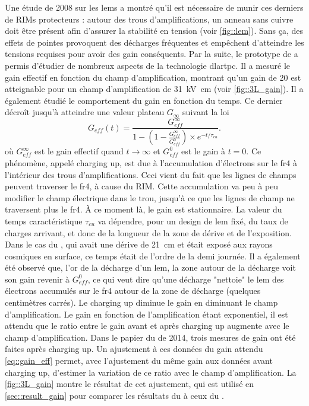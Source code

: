       Une étude de 2008 sur les \glspl{lem}\cite{Breskin2008} a montré qu'il est nécessaire de munir ces derniers de RIMs protecteurs : autour des trous d'amplifications, un anneau sans cuivre doit être présent afin d'assurer la stabilité en tension (voir \autoref{fig::lem}). Sans ça, des effets de pointes provoquent des décharges fréquentes et empêchent d'atteindre les tensions requises pour avoir des gain conséquents. Par la suite, le prototype de \threeL{}\cite{Cantini2013,Cantini2014} a permis d'étudier de nombreux aspects de la technologie \gls{dlartpc}. Il a mesuré le gain effectif en fonction du champ d'amplification, montrant qu'un gain de 20 est atteignable pour un champ d'amplification de \SI{31}{\kilo\volt\centi\meter} (voir \autoref{fig::3L_gain}). Il a également étudié le comportement du gain en fonction du temps. Ce dernier décroît jusqu'à atteindre une valeur plateau $G_{\infty}$ suivant la loi
      \begin{equation}
        G_{eff}(t) = \frac{G_{eff}^{\infty}}{1-\left(1-\frac{G_{eff}^{\infty}}{G_{eff}^0}\right)\times e^{-t/\tau_{cu}}}.
      \end{equation}
      où $G_{eff}^{\infty}$ est le gain effectif quand $t\to\infty$ et $G_{eff}^0$ est le gain à $t=0$. Ce phénomène, appelé charging up, est due à l'accumulation d'électrons sur le \gls{fr4} à l'intérieur des trous d'amplifications. Ceci vient du fait que les lignes de champs peuvent traverser le \gls{fr4}, à cause du RIM. Cette accumulation va peu à peu modifier le champ électrique dans le trou, jusqu'à ce que les lignes de champ ne traversent plus le \gls{fr4}. À ce moment là, le gain est stationnaire. La valeur du temps caractéristique $\tau_{cu}$ va dépendre, pour un design de \gls{lem} fixé, du taux de charges arrivant, et donc de la longueur de la zone de dérive et de l'exposition. Dans le cas du \threeL{}, qui avait une dérive de \SI{21}{\centi\meter} et était exposé aux rayons cosmiques en surface, ce temps était de l'ordre de la demi journée. Il a également été observé que, l'or de la décharge d'un \gls{lem}, la zone autour de la décharge voit son gain revenir à $G_{eff}^0$, ce qui veut dire qu'une décharge "nettoie" le \gls{lem} des électrons accumulés sur le \gls{fr4} autour de la zone de décharge (quelques centimètres carrés).  Le charging up diminue le gain en diminuant le champ d'amplification. Le gain en fonction de l'amplification étant exponentiel, il est attendu que le ratio entre le gain avant et après charging up augmente avec le champ d'amplification. Dans le papier du \threeL{} de 2014, trois mesures de gain ont été faites après charging up. Un ajustement à ces données du gain attendu \eqref{eq::gain_eff} permet, avec l'ajustement du même gain aux données avant charging up, d'estimer la variation de ce ratio avec le champ d'amplification. La \autoref{fig::3L_gain} montre le résultat de cet ajustement, qui est utilisé en \autoref{sec::result_gain} pour comparer les résultats du \TOO{} à ceux du \threeL{}.

